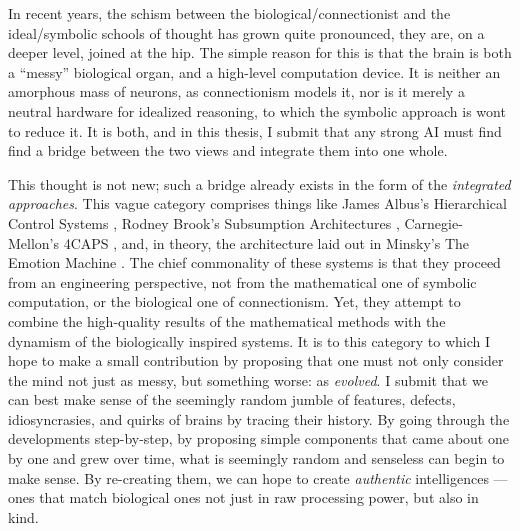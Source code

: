 In recent years, the schism between the biological/connectionist and the ideal/symbolic schools of thought has grown quite pronounced, they are, on a deeper level, joined at the hip. The simple reason for this is that the brain is both a ``messy'' biological organ, and a high-level computation device. It is neither an amorphous mass of neurons, as connectionism models it, nor is it merely a neutral hardware for idealized reasoning, to which the symbolic approach is wont to reduce it. It is both, and in this thesis, I submit that any strong AI must find find a bridge between the two views and integrate them into one whole.

This thought is not new; such a bridge already exists in the form of the {\em integrated approaches}. This vague category comprises things like James Albus's Hierarchical Control Systems \cite{albusHCS}, Rodney Brook's Subsumption Architectures \cite{brooksSubsumption}, Carnegie-Mellon's 4CAPS \cite{4caps}, and, in theory, the architecture laid out in Minsky's The Emotion Machine \cite{emotionMachine}. The chief commonality of these systems is that they proceed from an engineering perspective, not from the mathematical one of symbolic computation, or the biological one of connectionism. Yet, they attempt to combine the high-quality results of the mathematical methods with the dynamism of the biologically inspired systems. It is to this category to which I hope to make a small contribution by proposing that one must not only consider the mind not just as messy, but something worse: as {\em evolved}. I submit that we can best make sense of the seemingly random jumble of features, defects, idiosyncrasies, and quirks of brains by tracing their history. By going through the developments step-by-step, by proposing simple components that came about one by one and grew over time, what is seemingly random and senseless can begin to make sense. By re-creating them, we can hope to create {\em authentic} intelligences --- ones that match biological ones not just in raw processing power, but also in kind.

